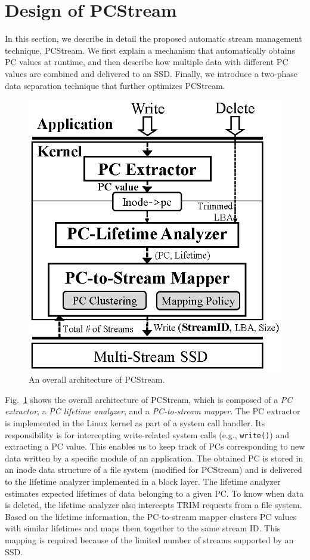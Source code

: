 \section{Design of PCStream}
In this section, we describe in detail the proposed automatic stream management
technique, {\sf PCStream}.  We first explain a mechanism that automatically
obtains PC values at runtime, and then describe how multiple data with
different PC values are combined and delivered to an SSD. Finally, we introduce
a two-phase data separation technique that further optimizes {\sf PCStream}.

\begin{figure}[t]
	\centering
	\includegraphics[width=0.6\linewidth]{figure/architecture4}
	\vspace{-10pt}
	\caption{An overall architecture of {\sf PCStream}.}
	\label{fig:architecture}
	\vspace{-15pt}
\end{figure}

Fig.~\ref{fig:architecture} shows the overall architecture of {\sf PCStream},
which is composed of a \textit{PC extractor}, a \textit{PC lifetime analyzer},
and a \textit{PC-to-stream mapper}.  The PC extractor is implemented in the
Linux kernel as part of a system call handler. Its responsibility is for
intercepting write-related system calls (e.g., \texttt{write()}) and extracting
a PC value.  This enables us to keep track of PCs corresponding to new data
written by a specific module of an application.  The obtained PC is stored in
an inode data structure of a file system (modified for \textsf{PCStream}) and
is delivered to the lifetime analyzer implemented in a block layer.  The
lifetime analyzer estimates expected lifetimes of data belonging to a given PC.
To know when data is deleted, the lifetime analyzer also intercepts TRIM
requests from a file system.  Based on the lifetime information, the
PC-to-stream mapper clusters PC values with similar lifetimes and maps them
together to the same stream ID.  This mapping is required because of the
limited number of streams supported by an SSD.

